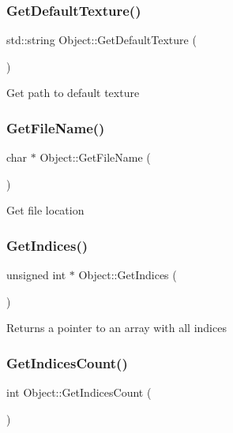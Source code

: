 \subsubsection{\texorpdfstring{GetDefaultTexture()}{GetDefaultTexture()}}
{\footnotesize\ttfamily std\+::string Object\+::\+Get\+Default\+Texture (\begin{DoxyParamCaption}{ }\end{DoxyParamCaption})}

Get path to default texture \mbox{\label{class_object_aeddce141951f466ad9d6ea4793cde17b}} 
\subsubsection{\texorpdfstring{GetFileName()}{GetFileName()}}
{\footnotesize\ttfamily char $\ast$ Object\+::\+Get\+File\+Name (\begin{DoxyParamCaption}{ }\end{DoxyParamCaption})}

Get file location \mbox{\label{class_object_a2764a9d62ef5266e17d98038f79fd24e}} 
\subsubsection{\texorpdfstring{GetIndices()}{GetIndices()}}
{\footnotesize\ttfamily unsigned int $\ast$ Object\+::\+Get\+Indices (\begin{DoxyParamCaption}{ }\end{DoxyParamCaption})}

Returns a pointer to an array with all indices \mbox{\label{class_object_a5cec05b7f0e39e610ff6d8bc1e5631bc}} 
\subsubsection{\texorpdfstring{GetIndicesCount()}{GetIndicesCount()}}
{\footnotesize\ttfamily int Object\+::\+Get\+Indices\+Count (\begin{DoxyParamCaption}{ }\end{DoxyParamCaption})}

